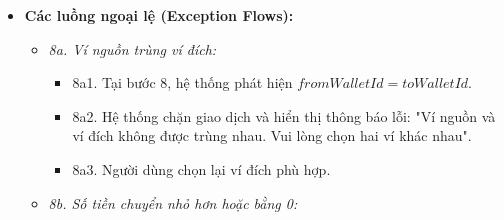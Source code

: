 \documentclass[11pt,a4paper]{article}
\providecommand{\tightlist}{
  \setlength{\itemsep}{0pt}\setlength{\parskip}{0pt}}
\begin{document}
\begin{itemize}
\begin{itemize}
    \begin{itemize}
    \tightlist
    \item
      2b1. Tại danh sách lịch sử chuyển tiền, Người dùng chọn một giao
      dịch và nhấn nút "Hủy chuyển tiền".
    \item
      2b2. Hệ thống hiển thị hộp thoại xác nhận hủy, liệt kê chi tiết
      các khoản hoàn nguyên sẽ diễn ra.
    \item
      2b3. Người dùng nhấn xác nhận hủy.
    \item
      2b4. Hệ thống kiểm tra điều kiện hoàn nguyên tại ví đích theo quy
      tắc \texttt{FR-TRF-03}: số dư khả dụng của ví đích phải lớn hơn
      hoặc bằng số tiền đã nhận (\(Balance_{to} \ge amount\)).
    \item
      2b5. Hệ thống thực hiện hoàn nguyên đối ứng nguyên tử:

      \begin{itemize}
      \tightlist
      \item
        Cộng trả lại \(amount\) vào số dư ví nguồn.
      \item
        Trừ \(amount\) khỏi số dư ví đích.
      \item
        Nếu giao dịch có phí chuyển tiền liên kết, hệ thống hoàn trả
        \(fee\) vào ví nguồn và xóa bản ghi chi tiêu phí trong bảng
        \texttt{transactions}.
      \end{itemize}
    \item
      2b6. Hệ thống cập nhật trạng thái của bản ghi chuyển tiền sang
      \texttt{CANCELLED} (hoặc xóa khỏi sổ chuyển tiền).
    \item
      2b7. Hệ thống hiển thị thông báo hủy chuyển tiền thành công và cập
      nhật lại số dư hai ví.
    \end{itemize}
  \end{itemize}
\item
  \textbf{Các luồng ngoại lệ (Exception Flows):}

  \begin{itemize}
  \tightlist
  \item
    \emph{8a. Ví nguồn trùng ví đích:}

    \begin{itemize}
    \tightlist
    \item
      8a1. Tại bước 8, hệ thống phát hiện \(fromWalletId = toWalletId\).
    \item
      8a2. Hệ thống chặn giao dịch và hiển thị thông báo lỗi: "Ví nguồn
      và ví đích không được trùng nhau. Vui lòng chọn hai ví khác nhau".
    \item
      8a3. Người dùng chọn lại ví đích phù hợp.
    \end{itemize}
  \item
    \emph{8b. Số tiền chuyển nhỏ hơn hoặc bằng 0:}


\end{itemize}
\end{itemize}
\end{document}
